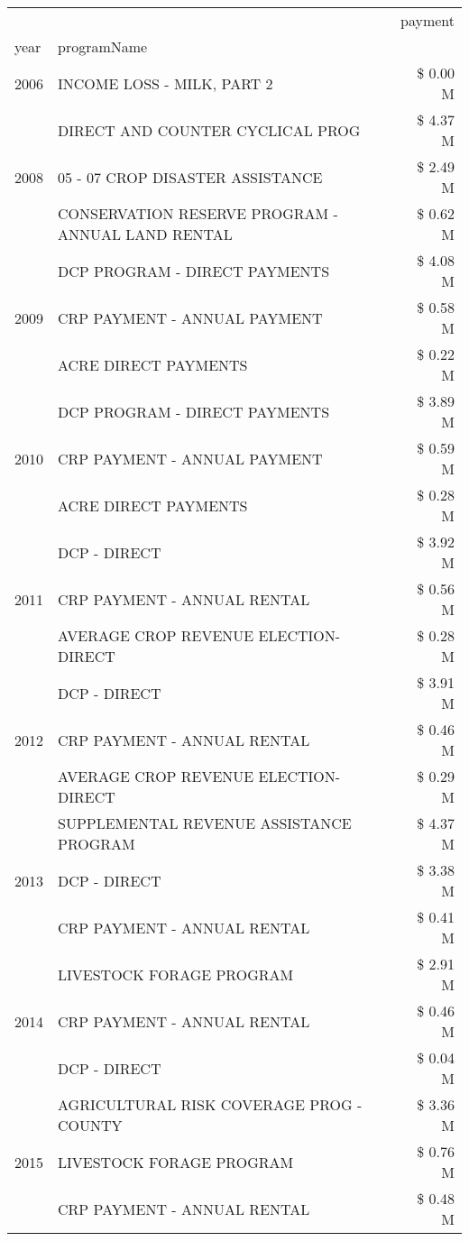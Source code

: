 \begin{tabular}{llr}
\toprule
 &  & payment \\
year & programName &  \\
\midrule
2006 & INCOME LOSS - MILK, PART 2 & \$ 0.00 M \\
\cline{1-3}
\multirow[t]{3}{*}{2008} & DIRECT AND COUNTER CYCLICAL PROG & \$ 4.37 M \\
 & 05 - 07 CROP DISASTER ASSISTANCE & \$ 2.49 M \\
 & CONSERVATION RESERVE PROGRAM - ANNUAL LAND RENTAL & \$ 0.62 M \\
\cline{1-3}
\multirow[t]{3}{*}{2009} & DCP PROGRAM - DIRECT PAYMENTS & \$ 4.08 M \\
 & CRP PAYMENT - ANNUAL PAYMENT & \$ 0.58 M \\
 & ACRE DIRECT PAYMENTS & \$ 0.22 M \\
\cline{1-3}
\multirow[t]{3}{*}{2010} & DCP PROGRAM - DIRECT PAYMENTS & \$ 3.89 M \\
 & CRP PAYMENT - ANNUAL PAYMENT & \$ 0.59 M \\
 & ACRE DIRECT PAYMENTS & \$ 0.28 M \\
\cline{1-3}
\multirow[t]{3}{*}{2011} & DCP - DIRECT & \$ 3.92 M \\
 & CRP PAYMENT - ANNUAL RENTAL & \$ 0.56 M \\
 & AVERAGE CROP REVENUE ELECTION-DIRECT & \$ 0.28 M \\
\cline{1-3}
\multirow[t]{3}{*}{2012} & DCP - DIRECT & \$ 3.91 M \\
 & CRP PAYMENT - ANNUAL RENTAL & \$ 0.46 M \\
 & AVERAGE CROP REVENUE ELECTION-DIRECT & \$ 0.29 M \\
\cline{1-3}
\multirow[t]{3}{*}{2013} & SUPPLEMENTAL REVENUE ASSISTANCE PROGRAM & \$ 4.37 M \\
 & DCP - DIRECT & \$ 3.38 M \\
 & CRP PAYMENT - ANNUAL RENTAL & \$ 0.41 M \\
\cline{1-3}
\multirow[t]{3}{*}{2014} & LIVESTOCK FORAGE PROGRAM & \$ 2.91 M \\
 & CRP PAYMENT - ANNUAL RENTAL & \$ 0.46 M \\
 & DCP - DIRECT & \$ 0.04 M \\
\cline{1-3}
\multirow[t]{3}{*}{2015} & AGRICULTURAL RISK COVERAGE PROG - COUNTY & \$ 3.36 M \\
 & LIVESTOCK FORAGE PROGRAM & \$ 0.76 M \\
 & CRP PAYMENT - ANNUAL RENTAL & \$ 0.48 M \\

\end{tabular}
